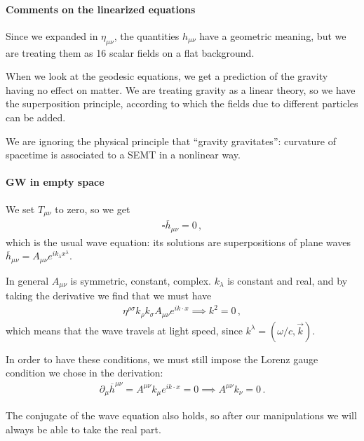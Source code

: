 \documentclass[main.tex]{subfiles}
\begin{document}
\paragraph{Comments on the linearized equations}

Since we expanded in \(\eta_{\mu \nu }\), the quantities \(h_{\mu \nu }\) have a geometric meaning, but we are treating them as 16 scalar fields on a flat background. 

When we look at the geodesic equations, we get a prediction of the gravity having no effect on matter. 
We are treating gravity as a linear theory, so we have the superposition principle, according to which the fields due to different particles can be added.


We are ignoring the physical principle that ``gravity gravitates'': curvature of spacetime is associated to a SEMT in a nonlinear way.

\paragraph{GW in empty space}

We set \(T_{\mu  \nu }\) to zero, so we get 
%
\begin{align}
\square \overline{h}_{\mu \nu } = 0
\,,
\end{align}
%
which is the usual wave equation: its solutions are superpositions of plane waves \(\overline{h}_{\mu \nu } = A_{\mu \nu } e^{i k_{\lambda }x^{\lambda }}\). 

In general \(A_{\mu \nu } \) is symmetric, constant, complex. \(k_{\lambda }\) is constant and real, and by taking the derivative we find that we must have
%
\begin{align}
\eta^{\rho \sigma } k_{\rho } k_{\sigma } A_{\mu \nu } e^{i k \cdot x } \implies k^2=0
\,,
\end{align}
%
which means that the wave travels at light speed, since \(k^{\lambda } = (\omega / c, \vec{k})\).

In order to have these conditions, we must still impose the Lorenz gauge condition we chose in the derivation:
%
\begin{align}
\partial_{\mu } \overline{h}^{\mu \nu } 
= A^{\mu \nu } k_{\mu } e^{i k \cdot x } = 0 
\implies A^{\mu \nu }k_{\nu } = 0
\,.
\end{align}

The conjugate of the wave equation also holds, so after our manipulations we will always be able to take the real part. 
\end{document}
